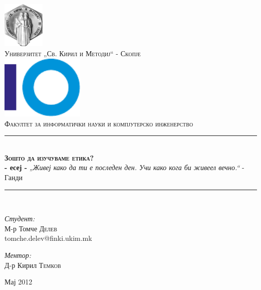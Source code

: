 \begin{titlepage}
\begin{center}
\newcommand{\HRule}{\rule{\linewidth}{0.5mm}}

\includegraphics[width=0.15\textwidth]{images/ukim}\\[1cm]
\textsc{\large Универзитет „Св. Кирил и Методиј“ - Скопје}\\[1.5cm]

\includegraphics[width=0.3\textwidth]{images/finki_logo}\\[1cm]
\textsc{\large Факултет за информатички науки и компјутерско
инженерство}\\[1.5cm]

\HRule \\[0.4cm]
{  \bfseries \textsc{Зошто да изучуваме етика?} \\[0.4cm] - есеј
-}
\vfill
\emph{„Живеј како да ти е последен ден. Учи како кога би живеел вечно.“} - Ганди
\vfill
\\[0.4cm]

\HRule \\[1.5cm]

\begin{minipage}{0.45\textwidth}
\begin{flushleft} 
\emph{Студент:}\\
М-р Томче \textsc{Делев}\\
tomche.delev@finki.ukim.mk
\end{flushleft}
\end{minipage}
\begin{minipage}{0.45\textwidth}
\begin{flushright} 
\emph{Ментор:} \\
Д-р Кирил \textsc{Темков}
\end{flushright}
\end{minipage}

\vfill

{\large Мај 2012}

\end{center}
\end{titlepage}